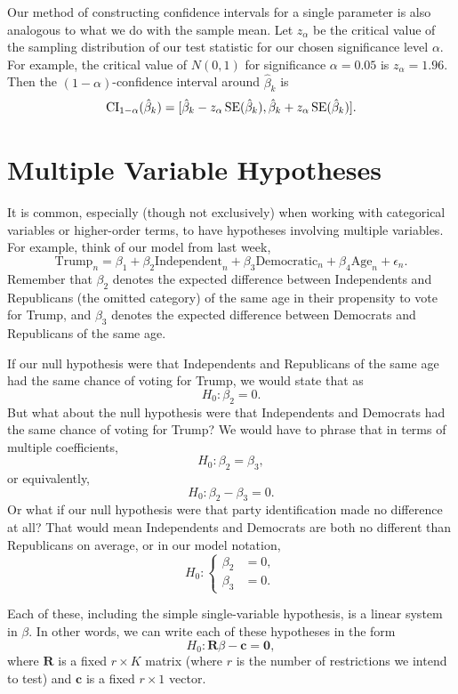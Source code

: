 \documentclass[
  12pt,
  oneside,openany]{book}
\begin{document}
Our method of constructing confidence intervals for a single parameter is also analogous to what we do with the sample mean. Let \(z_{\alpha}\) be the critical value of the sampling distribution of our test statistic for our chosen significance level \(\alpha\). For example, the critical value of \(N(0, 1)\) for significance \(\alpha = 0.05\) is \(z_{\alpha} = 1.96\). Then the \((1 - \alpha)\)-confidence interval around \(\hat{\beta}_k\) is
\[
\mathop{\rm CI}\nolimits_{1 - \alpha}(\hat{\beta}_k) = [\hat{\beta}_k - z_{\alpha} \mathop{\rm SE}\nolimits(\hat{\beta}_k), \hat{\beta}_k + z_{\alpha} \mathop{\rm SE}\nolimits(\hat{\beta}_k)].
\]

\hypertarget{multiple-variable-hypotheses}{%
\section{Multiple Variable Hypotheses}\label{multiple-variable-hypotheses}}

It is common, especially (though not exclusively) when working with categorical variables or higher-order terms, to have hypotheses involving multiple variables. For example, think of our model from last week,
\[
\text{Trump}_n = \beta_1 + \beta_2 \text{Independent}_n + \beta_3 \text{Democratic}_n + \beta_4 \text{Age}_n + \epsilon_n.
\]
Remember that \(\beta_2\) denotes the expected difference between Independents and Republicans (the omitted category) of the same age in their propensity to vote for Trump, and \(\beta_3\) denotes the expected difference between Democrats and Republicans of the same age.

If our null hypothesis were that Independents and Republicans of the same age had the same chance of voting for Trump, we would state that as
\[
H_0 : \beta_2 = 0.
\]
But what about the null hypothesis were that Independents and Democrats had the same chance of voting for Trump? We would have to phrase that in terms of multiple coefficients,
\[
H_0 : \beta_2 = \beta_3,
\]
or equivalently,
\[
H_0 : \beta_2 - \beta_3 = 0.
\]
Or what if our null hypothesis were that party identification made no difference at all? That would mean Independents and Democrats are both no different than Republicans on average, or in our model notation,
\[
H_0 : \left\{ \begin{aligned}
\beta_2 &= 0, \\
\beta_3 &= 0.
\end{aligned} \right.
\]

Each of these, including the simple single-variable hypothesis, is a linear system in \(\beta\). In other words, we can write each of these hypotheses in the form
\[
H_0 : \mathbf{R} \beta - \mathbf{c} = \mathbf{0},
\]
where \(\mathbf{R}\) is a fixed \(r \times K\) matrix (where \(r\) is the number of restrictions we intend to test) and \(\mathbf{c}\) is a fixed \(r \times 1\) vector.
\end{document}
